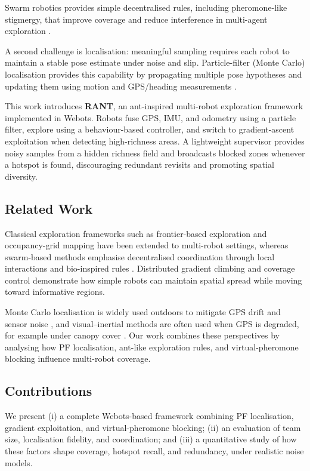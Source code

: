 \documentclass[lettersize,journal]{IEEEtran}
\begin{document}
Swarm robotics provides simple decentralised rules, including pheromone-like
stigmergy, that improve coverage and reduce interference in multi-agent
exploration \cite{ref4,ref5,ref11}.

A second challenge is localisation: meaningful sampling requires each robot to maintain a stable pose estimate under noise and slip. Particle-filter (Monte Carlo) localisation provides this capability by propagating multiple pose hypotheses and updating them using motion and GPS/heading measurements \cite{ref6,ref7,ref8}. 

This work introduces \textbf{RANT}, an ant-inspired multi-robot exploration framework implemented in Webots. Robots fuse GPS, IMU, and odometry using a particle filter, explore using a behaviour-based controller, and switch to gradient-ascent exploitation when detecting high-richness areas. A lightweight supervisor provides noisy samples from a hidden richness field and broadcasts blocked zones whenever a hotspot is found, discouraging redundant revisits and promoting spatial diversity.

\subsection*{Related Work}
Classical exploration frameworks such as frontier-based exploration \cite{ref1} and occupancy-grid mapping \cite{ref2} have been extended to multi-robot settings, whereas swarm-based methods emphasise decentralised coordination through local interactions and bio-inspired rules \cite{ref4,ref5,ref10,ref11}. Distributed gradient climbing and coverage control \cite{ref9,ref13,ref12} demonstrate how simple robots can maintain spatial spread while moving toward informative regions.

Monte Carlo localisation is widely used outdoors to mitigate GPS drift and sensor noise \cite{ref6,ref7,ref8}, and visual–inertial methods are often used when GPS is degraded, for example under canopy cover \cite{ref14}. Our work combines these perspectives by analysing how PF localisation, ant-like exploration rules, and virtual-pheromone blocking influence multi-robot coverage.
\subsection*{Contributions}
We present (i) a complete Webots-based framework combining PF localisation,
gradient exploitation, and virtual-pheromone blocking; (ii) an evaluation of
team size, localisation fidelity, and coordination; and (iii) a quantitative
study of how these factors shape coverage, hotspot recall, and redundancy, under realistic noise models.
\end{document}
